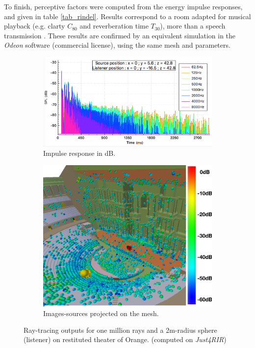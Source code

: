 \documentclass{aes2e}
\begin{document}
To finish, perceptive factors were computed from the energy impulse responses, and given in table \ref{tab_rindel}. Results correspond to a room adapted for musical playback (e.g. clarty $C_{80}$ and reverberation time $T_{30}$), more than a speech transmission \cite{acoustique}. These results are confirmed by an equivalent simulation in the \textit{Odeon} software (commercial license), using the same mesh and parameters. 

\begin{figure}[t]
\centering
	\begin{subfigure}{0.4\textwidth}
		\includegraphics[width=\linewidth]{rirTheatreAvecDecor}
		\caption{Impulse response in dB.}
		\label{rirTheatre20}
	\end{subfigure}
	\begin{subfigure}{0.35\textwidth}
\includegraphics[width=\linewidth]{SI60dB}
		\caption{Images-sources projected on the mesh.}
		\label{isTheatre20}
	\end{subfigure}
	\caption{Ray-tracing outputs for one million rays and a 2m-radius sphere (listener) on restituted theater of Orange.  (computed on \textit{Just4RIR})}
	\label{SI60dB}
\end{figure}
\end{document}
